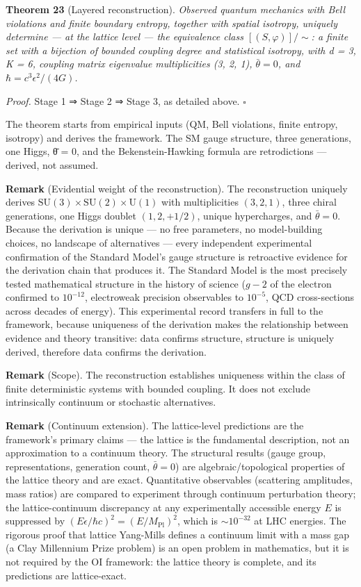 \documentclass[
  11pt,
]{article}
\begin{document}
\textbf{Theorem 23} (Layered reconstruction). \emph{Observed quantum
mechanics with Bell violations and finite boundary entropy, together
with spatial isotropy, uniquely determine --- at the lattice level ---
the equivalence class \([(S, \varphi)]/\!\sim\): a finite set with a
bijection of bounded coupling degree and statistical isotropy, with d =
3, K = 6, coupling matrix eigenvalue multiplicities (3, 2, 1),
\(\bar{\theta} = 0\), and \(\hbar = c^3 \epsilon^2/(4G)\).}

\emph{Proof.} Stage 1 ⇒ Stage 2 ⇒ Stage 3, as detailed above.
\(\square\)

The theorem starts from empirical inputs (QM, Bell violations, finite
entropy, isotropy) and derives the framework. The SM gauge structure,
three generations, one Higgs, θ̄ = 0, and the Bekenstein-Hawking formula
are retrodictions --- derived, not assumed.

\textbf{Remark} (Evidential weight of the reconstruction). The
reconstruction uniquely derives
\(\text{SU}(3) \times \text{SU}(2) \times \text{U}(1)\) with
multiplicities \((3, 2, 1)\), three chiral generations, one Higgs
doublet \((1, 2, +1/2)\), unique hypercharges, and \(\bar{\theta} = 0\).
Because the derivation is unique --- no free parameters, no
model-building choices, no landscape of alternatives --- every
independent experimental confirmation of the Standard Model's gauge
structure is retroactive evidence for the derivation chain that produces
it. The Standard Model is the most precisely tested mathematical
structure in the history of science (\(g - 2\) of the electron confirmed
to \(10^{-12}\), electroweak precision observables to \(10^{-5}\), QCD
cross-sections across decades of energy). This experimental record
transfers in full to the framework, because uniqueness of the derivation
makes the relationship between evidence and theory transitive: data
confirms structure, structure is uniquely derived, therefore data
confirms the derivation.

\textbf{Remark} (Scope). The reconstruction establishes uniqueness
within the class of finite deterministic systems with bounded coupling.
It does not exclude intrinsically continuum or stochastic alternatives.

\textbf{Remark} (Continuum extension). The lattice-level predictions are
the framework's primary claims --- the lattice is the fundamental
description, not an approximation to a continuum theory. The structural
results (gauge group, representations, generation count,
\(\bar{\theta} = 0\)) are algebraic/topological properties of the
lattice theory and are exact. Quantitative observables (scattering
amplitudes, mass ratios) are compared to experiment through continuum
perturbation theory; the lattice-continuum discrepancy at any
experimentally accessible energy \(E\) is suppressed by
\((E\epsilon/\hbar c)^2 = (E/M_{\text{Pl}})^2\), which is
\(\sim 10^{-32}\) at LHC energies. The rigorous proof that lattice
Yang-Mills defines a continuum limit with a mass gap (a Clay Millennium
Prize problem) is an open problem in mathematics, but it is not required
by the OI framework: the lattice theory is complete, and its predictions
are lattice-exact.
\end{document}
